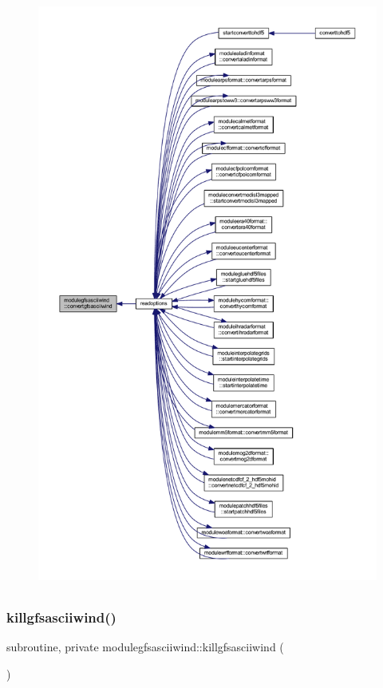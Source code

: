 \begin{figure}[H]
\begin{center}
\leavevmode
\includegraphics[height=550pt]{namespacemodulegfsasciiwind_a4a4a0dde4375b81a03f64232de2622c5_icgraph}
\end{center}
\end{figure}
\mbox{\label{namespacemodulegfsasciiwind_af8a728ba2b355e73d4c07f7d2a55c500}} 
\subsubsection{\texorpdfstring{killgfsasciiwind()}{killgfsasciiwind()}}
{\footnotesize\ttfamily subroutine, private modulegfsasciiwind\+::killgfsasciiwind (\begin{DoxyParamCaption}{ }\end{DoxyParamCaption})\hspace{0.3cm}{\ttfamily [private]}}

